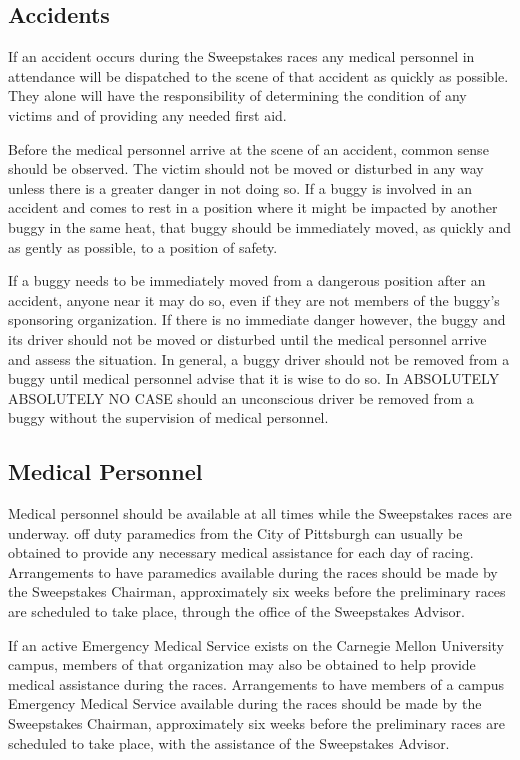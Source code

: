 \documentclass[openany]{book}
\begin{document}
\subsection{Accidents}

If an accident occurs during the Sweepstakes races any medical personnel in attendance will be dispatched to the scene of that accident as quickly as possible. They alone will have the responsibility of determining the condition of any victims and of providing any needed first aid.

Before the medical personnel arrive at the scene of an accident, common sense should be observed. The victim should not be moved or disturbed in any way unless there is a greater danger in not doing so. If a buggy is involved in an accident and comes to rest in a position where it might be impacted by another buggy in the same heat, that buggy should be immediately moved, as quickly and as gently as possible, to a position of safety.

If a buggy needs to be immediately moved from a dangerous position after an accident, anyone near it may do so, even if they are not members of the buggy's sponsoring organization. If there is no immediate danger however, the buggy and its driver should not be moved or disturbed until the medical personnel arrive and assess the situation. In general, a buggy driver should not be removed from a buggy until medical personnel advise that it is wise to do so. In ABSOLUTELY ABSOLUTELY NO CASE should an unconscious driver be removed from a buggy without the supervision of medical personnel.

\subsection{Medical Personnel}

Medical personnel should be available at all times while the Sweepstakes races are underway. off duty paramedics from the City of Pittsburgh can usually be obtained to provide any necessary medical assistance for each day of racing. Arrangements to have paramedics available during the races should be made by the Sweepstakes Chairman, approximately six weeks before the preliminary races are scheduled to take place, through the office of the Sweepstakes Advisor.

If an active Emergency Medical Service exists on the Carnegie Mellon University campus, members of that organization may also be obtained to help provide medical assistance during the races. Arrangements to have members of a campus Emergency Medical Service available during the races should be made by the Sweepstakes Chairman, approximately six weeks before the preliminary races are scheduled to take place, with the assistance of the Sweepstakes Advisor.
\end{document}
